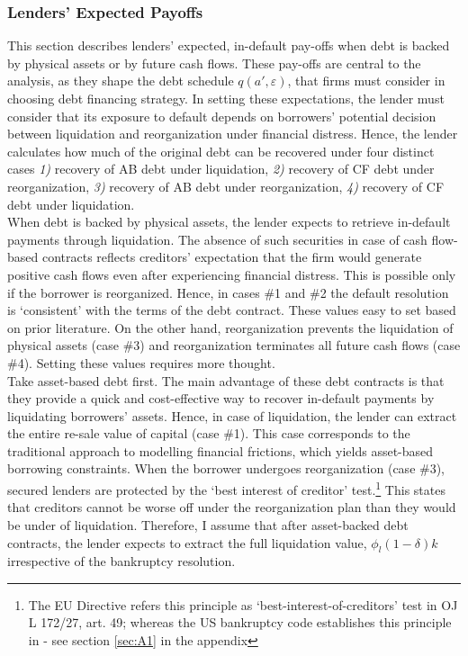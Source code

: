 \documentclass[12pt]{article}
\begin{document}
\subsubsection{Lenders' Expected Payoffs}   \label{sec:Default Resolution}
This section describes lenders' expected, in-default pay-offs when debt is backed by physical assets or by future cash flows. These pay-offs are central to the analysis, as they shape the debt schedule $q(a', \varepsilon)$, that firms must consider in choosing debt financing strategy. In setting these expectations, the lender must consider that its exposure to default depends on borrowers' potential decision between liquidation and reorganization under financial distress. Hence, the lender calculates how much of the original debt can be recovered under four distinct cases \textit{1)} recovery of AB debt under liquidation, \textit{2)} recovery of CF debt under reorganization, \textit{3)} recovery of AB debt under reorganization, \textit{4)} recovery of CF debt under liquidation. \vspace{3mm} \\
When debt is backed by physical assets, the lender expects to retrieve in-default payments through liquidation. The absence of such securities in case of cash flow-based contracts reflects creditors' expectation that the firm would generate positive cash flows even after experiencing financial distress. This is possible only if the borrower is reorganized. Hence, in cases \#1 and \#2 the default resolution is `consistent' with the terms of the debt contract. These values easy to set based on prior literature. On the other hand, reorganization prevents the liquidation of physical assets (case \#3) and reorganization terminates all future cash flows (case \#4). Setting these values requires more thought. \vspace{3mm} \\
Take asset-based debt first. The main advantage of these debt contracts is that they provide a quick and cost-effective way to recover in-default payments by liquidating borrowers’ assets. Hence, in case of liquidation, the lender can extract the entire re-sale value of capital (case \#1). This case corresponds to the traditional approach to modelling financial frictions, which yields asset-based borrowing constraints. When the borrower undergoes reorganization (case \#3),  secured lenders are protected by the ‘best interest of creditor’ test.\footnote{The EU Directive refers this principle as ‘best-interest-of-creditors’ test in OJ L 172/27, art. 49; whereas the US bankruptcy code establishes this principle in 
 - see section \ref{sec:A1} in the appendix} This states that creditors cannot be worse off under the reorganization plan than they would be under of liquidation. Therefore, I assume that after asset-backed debt contracts, the lender expects to extract the full liquidation value, $\phi_l(1-\delta)k$ irrespective of the bankruptcy resolution. \vspace{3mm} \\
\end{document}
